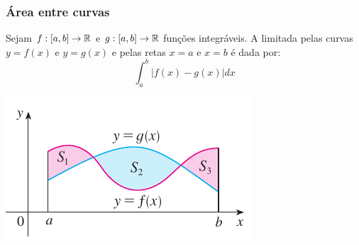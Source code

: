 %
%
%
%
%
%
%

\begin{frame}
\frametitle{Área entre curvas}



\begin{defin}
Sejam $f:[a,b]\to \mathbb{R}$ e $g:[a,b]\to \mathbb{R}$  funções integráveis. A  limitada pelas curvas $y=f(x)$ e $y=g(x)$ e pelas retas $x=a$ e $x=b$ é dada por:
$$\int_a^b|f(x)-g(x)|dx$$
\end{defin}

\begin{center}
\includegraphics[scale=.7]{area-curvas.png}
\end{center}


\end{frame}

